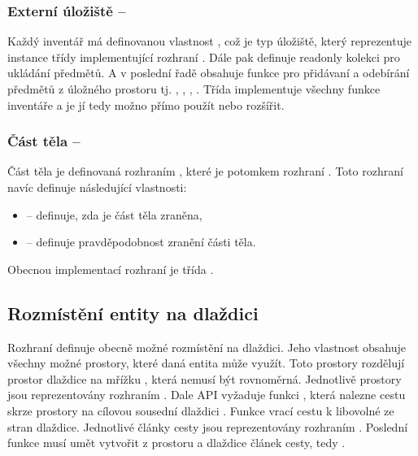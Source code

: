 \subsubsection{Externí úložiště -- }
Každý inventář má definovanou vlastnost , což je typ úložiště, který reprezentuje instance třídy 
implementující rozhraní . Dále pak definuje readonly kolekci  pro ukládání předmětů.
A v poslední řadě obsahuje funkce pro přidávaní a odebírání předmětů z úložného prostoru tj. , , ,
. Třída  implementuje všechny funkce inventáře a je jí tedy možno přímo použít nebo rozšířit.

\subsubsection{Část těla -- }
Část těla je definovaná rozhraním , které je potomkem rozhraní . Toto rozhraní navíc definuje 
následující vlastnosti: 
\begin{itemize}
\item {} -- definuje, zda je část těla zraněna,
\item {} -- definuje pravděpodobnost zranění části těla.
\end{itemize}

Obecnou implementací rozhraní je třída . 

\subsection{Rozmístění entity na dlaždici}\label{layout-manager-section}

Rozhraní  definuje obecně možné rozmístění na dlaždici. Jeho vlastnost  obsahuje všechny možné prostory, které daná entita může využít.
Toto prostory rozdělují prostor dlaždice na mřížku , která nemusí být rovnoměrná.
Jednotlivě prostory jsou reprezentovány rozhraním . Dale API vyžaduje funkci , která nalezne cestu skrze prostory
na cílovou sousední dlaždici . Funkce  vrací cestu k libovolné ze stran dlaždice. Jednotlivé články cesty jsou 
reprezentovány rozhraním . Poslední funkce musí umět vytvořit z prostoru a dlaždice článek cesty,
tedy .  


